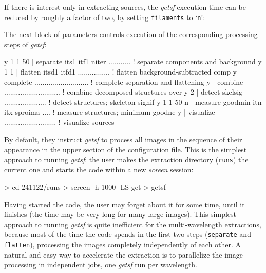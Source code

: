 \documentclass[a4paper,10pt]{article}
\begin{document}
If there is interest only in extracting sources, the \textsl{getsf} execution time can be reduced by roughly a factor of two, by
setting \verb!filaments! to `\verb!n!':
\begin{verbnobox}[\mbox{}\small]
 y n                 | sources filaments .................. ! extract sources and/or filaments {
\end{verbnobox}
The next block of parameters controls execution of the corresponding processing steps of \textsl{getsf}:
\begin{verbnobox}[\mbox{}\small]
 y 1 1 50            | separate its1 itf1 niter ........... ! separate components and background
 y 1 1               | flatten itsd1 itfd1 ................ ! flatten background-subtracted comp
 y                   | complete ........................... ! complete separation and flattening
 y                   | combine ............................ ! combine decomposed structures over
 y 2                 | detect skelsig ..................... ! detect structures; skeleton signif
 y 1 1 50 n          | measure goodmin itn itx sproima .... ! measure structures; minimum goodne
 y                   | visualize .......................... ! visualize sources
\end{verbnobox}
By default, they instruct \textsl{getsf} to process all images in the sequence of their appearance in the upper section of the
configuration file. This is the simplest approach to running \textsl{getsf}: the user makes the extraction directory (\verb!runs!)
the current one and starts the code within a new \textsl{screen} session:
\begin{verbnobox}[\mbox{}\small]
> cd 241122/runs
> screen -h 1000 -LS get
> getsf
\end{verbnobox}
Having started the code, the user may forget about it for some time, until it finishes (the time may be very long for many large
images). This simplest approach to running \textsl{getsf} is quite inefficient for the multi-wavelength extractions, because most
of the time the code spends in the first two steps (\verb!separate! and \verb!flatten!), processing the images completely
independently of each other. A natural and easy way to accelerate the extraction is to parallelize the image processing in
independent jobs, one \textsl{getsf} run per wavelength.
\end{document}
